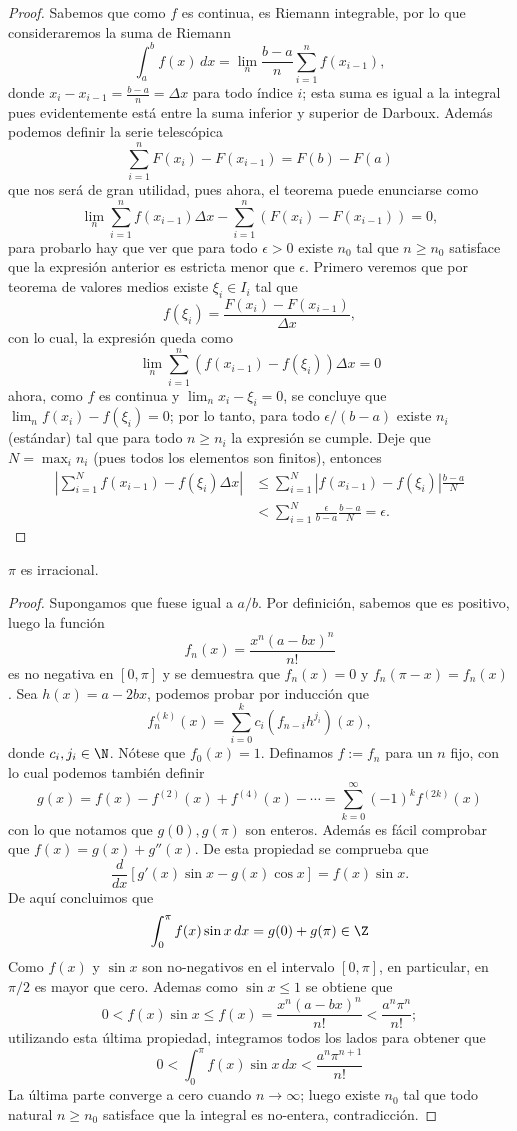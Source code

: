 \documentclass[11pt,oneside,a4paper]{book}
\begin{document}
\begin{proof}
Sabemos que como $f$ es continua, es Riemann integrable, por lo que consideraremos la suma de Riemann
$$\int_a^b f(x)\,dx=\lim_n\frac{b-a}{n}\sum_{i=1}^nf(x_{i-1}),$$
donde $x_i-x_{i-1}=\frac{b-a}{n}=\Delta x$ para todo índice $i$; esta suma es igual a la integral pues evidentemente está entre la suma inferior y superior de Darboux. Además podemos definir la serie telescópica
$$\sum_{i=1}^n F(x_i)-F(x_{i-1})=F(b)-F(a)$$
que nos será de gran utilidad, pues ahora, el teorema puede enunciarse como
$$\lim_n\sum_{i=1}^nf(x_{i-1})\Delta x-\sum_{i=1}^n(F(x_i)-F(x_{i-1}))=0,$$
para probarlo hay que ver que para todo $\epsilon\gt 0$ existe $n_0$ tal que $n\geq n_0$ satisface que la expresión anterior es estricta menor que $\epsilon$. Primero veremos que por teorema de valores medios existe $\xi_i\in I_i$ tal que
$$f(\xi_i)=\frac{F(x_i)-F(x_{i-1})}{\Delta x},$$
con lo cual, la expresión queda como
$$\lim_n\sum_{i=1}^n(f(x_{i-1})-f(\xi_i))\Delta x=0$$
ahora, como $f$ es continua y $\lim_n x_i-\xi_i=0$, se concluye que $\lim_n f(x_i)-f(\xi_i)=0$; por lo tanto, para todo $\epsilon/(b-a)$ existe $n_i$ (estándar) tal que para todo $n\geq n_i$ la expresión se cumple. Deje que $N=\max_in_i$ (pues todos los elementos son finitos), entonces
\begin{align*}
|\sum_{i=1}^N f(x_{i-1})-f(\xi_i)\Delta x|&\leq\sum_{i=1}^N|f(x_{i-1})-f(\xi_i)|\frac{b-a}{N}\\
&\lt\sum_{i=1}^N\frac{\epsilon}{b-a}\frac{b-a}{N}=\epsilon.
\end{align*}
\end{proof}
\begin{thm}
$\pi$ es irracional.
\end{thm}
\begin{proof}
Supongamos que fuese igual a $a/b$. Por definición, sabemos que es positivo, luego la función
$$f_n(x)=\frac{x^n(a-bx)^n}{n!}$$
es no negativa en $[0,\pi]$ y se demuestra que $f_n(x)=0$ y $f_n(\pi-x)=f_n(x)$. Sea $h(x)=a-2bx$, podemos probar por inducción que
$$f_n^{(k)}(x)=\sum_{i=0}^kc_i(f_{n-i}h^{j_i})(x),$$
donde $c_i,j_i\in\N$. Nótese que $f_0(x)=1$. Definamos $f:=f_n$ para un $n$ fijo, con lo cual podemos también definir
$$g(x)=f(x)-f^{(2)}(x)+f^{(4)}(x)-\cdots=\sum_{k=0}^\infty(-1)^kf^{(2k)}(x)$$
con lo que notamos que $g(0),g(\pi)$ son enteros. Además es fácil comprobar que $f(x)=g(x)+g''(x)$. De esta propiedad se comprueba que
$$\frac{d}{dx}[g'(x)\sin x-g(x)\cos x]=f(x)\sin x.$$
De aquí concluimos que
$$\int_0^\pi f(x)\sin x\,dx=g(0)+g(\pi)\in\Z$$
Como $f(x)$ y $\sin x$ son no-negativos en el intervalo $[0,\pi]$, en particular, en $\pi/2$ es mayor que cero. Ademas como $\sin x\leq 1$ se obtiene que
$$0\lt f(x)\sin x\leq f(x)=\frac{x^n(a-bx)^n}{n!}\lt\frac{a^n\pi^n}{n!};$$
utilizando esta última propiedad, integramos todos los lados para obtener que
$$0\lt\int_0^\pi f(x)\sin x\,dx\lt\frac{a^n\pi^{n+1}}{n!}$$
La última parte converge a cero cuando $n\to\infty$; luego existe $n_0$ tal que todo natural $n\geq n_0$ satisface que la integral es no-entera, contradicción.
\end{proof}
\end{document}
